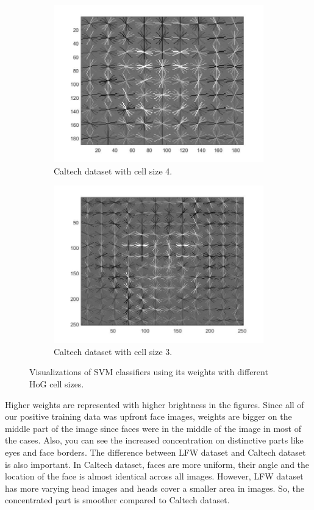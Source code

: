 \documentclass{article}
\begin{document}
\begin{figure}[!htb]
\begin{subfigure}{.44\textwidth}
  \includegraphics[width=.99\textwidth]{hogs_4.jpg}
\caption{Caltech dataset with cell size 4.}
\end{subfigure}
\begin{subfigure}{.54\textwidth}
  \centering
  \includegraphics[width=.99\textwidth]{hogs_3.jpg}
\caption{Caltech dataset with cell size 3.}
\end{subfigure}
\caption{Visualizations of SVM classifiers using its weights with different HoG cell sizes.}
\end{figure}

Higher weights are represented with higher brightness in the figures. Since all of our positive training data was upfront face images, weights are bigger on the middle part of the image since faces were in the middle of the image in most of the cases. Also, you can see the increased concentration on distinctive parts like eyes and face borders. The difference between LFW dataset and Caltech dataset is also important. In Caltech dataset, faces are more uniform, their angle and the location of the face is almost identical across all images. However, LFW dataset has more varying head images and heads cover a smaller area in images. So, the concentrated part is smoother compared to Caltech dataset.
\end{document}
